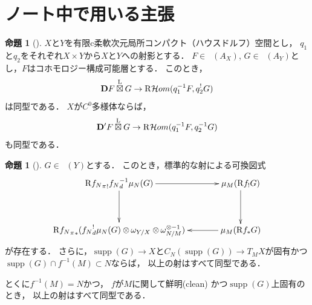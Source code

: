 \documentclass[leqno, 10pt, a4paper, dvipdfmx]{jsarticle}
\theoremstyle{definition}
\numberwithin{equation}{section}
\newcommand{\supp}{\mathop{\mathrm{supp}}\nolimits}
\newcommand{\Dompb}{\mathop{\mathsf{D}^\mathrm{b}}\nolimits}
\newcommand{\HOM}{\mathop{\mathcal{H}\hspace{-0pt}om}\nolimits}%
\newcommand{\RHOM}{\mathop{\mathrm{R}\hspace{-1.5pt}\HOM}\nolimits}
\newcommand{\Rder}{\mathrm{R}}
\newcommand{\vD}{\mathbf{D}}
\newcommand{\tens}[1][]{\mathbin{\otimes_{\raise1.5ex\hbox to-.1em{}{#1}}}}
\newcommand{\etens}{\mathbin{\boxtimes}}
\newcommand{\letens}{\overset{\mathrm{L}}{\etens}}
\theoremstyle{mystyle}
\newtheorem{PRP}[AXM]{命題}
\renewenvironment{leftbar}{%
  \def\FrameCommand{\textcolor{lightgray}{\vrule width 4pt} \hspace{10pt}}%
  \MakeFramed {\advance\hsize-\width \FrameRestore}}%
{\endMakeFramed}
\newcommand{\mpb}[1][]{{#1}_{\pi}} %
\newcommand{\mdiff}[1][]{{#1}_{d}} %
\begin{document}
\clearpage
\appendix
\section{ノート中で用いる主張}
\begin{leftbar}
\begin{PRP}[{\cite[Prop.3.4.4.]{KS90}}]\label{prp3.4.4}
  \(X\)と\(Y\)を有限c柔軟次元局所コンパクト（ハウスドルフ）空間とし，
  \(q_1\)と\(q_2\)をそれぞれ\(X\times Y\)から\(X\)と\(Y\)への射影とする．
  \(F\in\Dompb(A_X)\), \(G\in\Dompb(A_Y)\)とし，\(F\)はコホモロジー構成可能層とする．
  このとき，
  \[
    \vD{F}\letens G\to \RHOM(q_1^{-1}F,q_2^{!}G)
  \]は同型である．
  \(X\)が\(C^0\)多様体ならば，\[
    \vD'{F}\letens G\to \RHOM(q_1^{-1}F,q_2^{-1}G)
  \]も同型である．
\end{PRP}
\end{leftbar}

\begin{leftbar}
\begin{PRP}[{\cite[Prop.4.3.4]{KS90}}]\label{prp4.3.4}
  \(G\in\Dompb(Y)\)とする．
  このとき，標準的な射による可換図式    
  \[    
      \vcenter{\xymatrix@C=36pt@R=36pt{
      \Rder{{\mpb[f_{N}]}_{!}}{\mdiff[f_{N}]^{-1}}\mu_{N}(G)
      \ar[d]
      \ar[r]
      &
      \mu_{M}(\Rder{f_{!}}G)
      \ar[d]
      \\
      \Rder{{\mpb[f_{N}]}_{\ast}}({\mdiff[f_{N}]^{!}}\mu_{N}(G)\tens[]\omega_{Y/X}\tens[]\omega_{N/M}^{\otimes{-1}})
      &
      \mu_{M}(\Rder{f_{\ast}}G)
      \ar[l]
      }}
  \]が存在する．
  さらに，\(\supp(G)\to X\)と\(
      C_N(\supp(G))\to T_{M}X
  \)が固有かつ\(\supp(G)\cap f^{-1}(M)\subset N\)ならば，
  以上の射はすべて同型である．
  
  とくに\(f^{-1}(M)=N\)かつ，
  \(f\)が\(M\)に関して鮮明\footnotemark[2] (clean) かつ\(\supp(G)\)上固有のとき，
  以上の射はすべて同型である．
\end{PRP}
\end{leftbar}

\end{document}
